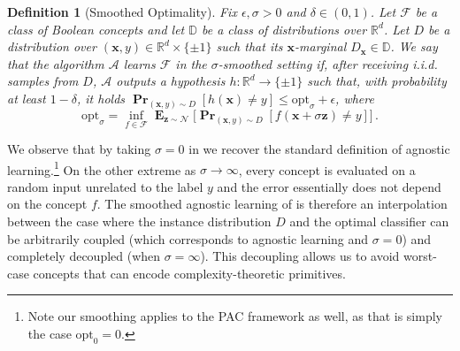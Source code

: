 \documentclass[10pt,a4paper]{article}
\newtheorem{definition}{Definition}[section]
\renewcommand\vec[1]{\mathbf{#1}}
\DeclareMathOperator*{\pr}{\mathbf{Pr}}
\DeclareMathOperator*{\E}{\mathbf{E}}
\newcommand{\normal}{\mathcal{N}}
\newcommand{\R}{\mathbb{R}}
\newcommand{\N}{\mathbb{N}}
\newcommand{\eps}{\epsilon}
\newcommand{\opt}{\mathrm{opt}}
\newcommand{\1}{\Ind}
\newcommand{\x}{\vec x}
\newcommand{\z}{\vec z}
\newcommand{\F}{\mathcal{F}}
\newcommand{\Gauss}{\mathcal{N}}
\newcommand{\Dmarginal}{D_{\x}}
\newcommand{\Djoint}{D}
\newcommand{\Alg}{\mathcal{A}}
\newcommand{\Dclass}{\mathbb{D}}
\begin{document}
\begin{definition}[Smoothed Optimality]\label{definition:concept-smoothing} 
Fix $\eps, \sigma>0$ and $\delta\in (0,1)$.
Let $\F$ be a class of Boolean concepts and let $\Dclass$ be a class of distributions over $\R^d$.
    Let $\Djoint$ be a distribution over $(\x, y) \in \R^d\times \{\pm 1\}$ such that its $\x$-marginal $\Dmarginal\in \Dclass$.
    We say that the algorithm $\Alg$ learns $\F$ in the $\sigma$-smoothed setting if, after receiving i.i.d. samples from $\Djoint$, 
    $\Alg$ outputs a hypothesis $h:\R^d \to \{\pm 1\}$ such that,
    with probability at least $1-\delta$, it holds
        $\pr_{(\x, y) \sim \Djoint}[ h(\x) \neq y] \le 
        \opt_\sigma + \eps$,
        where 
    \begin{equation}\label{equation:concept-smoothing-goal}
    \opt_\sigma = 
    \inf_{f \in \mathcal F} 
    \E_{\z\sim\Gauss}
    \Big[
         \pr_{(\x, y) \sim \Djoint}[ f(\x + \sigma \z) \neq y ] 
         \Big]
         \,.
    \end{equation}
\end{definition}

We observe that by taking $\sigma = 0$ in  we recover the standard definition of agnostic learning.\footnote{Note our smoothing applies to the PAC framework as well, as that is simply the case $\opt_{0} = 0$.}  On the other extreme as $\sigma \to \infty$, every concept is 
evaluated on a random input unrelated to the label $y$ and the error essentially does not depend on the 
concept $f$. The smoothed agnostic learning of  is therefore an interpolation between the case where the instance distribution $D$ and the optimal classifier can be arbitrarily coupled (which corresponds to agnostic learning and $\sigma = 0$) and completely decoupled (when $\sigma = \infty$).  This decoupling allows us to avoid worst-case concepts that can encode complexity-theoretic primitives.  

\end{document}

